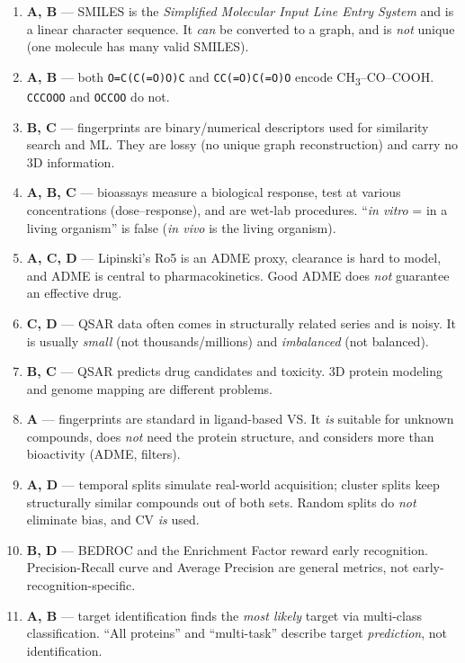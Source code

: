 \documentclass[11pt,oneside]{article}
\begin{document}
\begin{enumerate}[label=\textbf{Q\arabic*.}, leftmargin=3em, itemsep=4pt]
  \item \textbf{A, B} --- SMILES is the \emph{Simplified Molecular Input Line Entry System} and is a linear character sequence. It \emph{can} be converted to a graph, and is \emph{not} unique (one molecule has many valid SMILES).
  \item \textbf{A, B} --- both \texttt{O=C(C(=O)O)C} and \texttt{CC(=O)C(=O)O} encode CH\textsubscript{3}--CO--COOH. \texttt{CCCOOO} and \texttt{OCCOO} do not.
  \item \textbf{B, C} --- fingerprints are binary/numerical descriptors used for similarity search and ML. They are lossy (no unique graph reconstruction) and carry no 3D information.
  \item \textbf{A, B, C} --- bioassays measure a biological response, test at various concentrations (dose--response), and are wet-lab procedures. ``\emph{in vitro} = in a living organism'' is false (\emph{in vivo} is the living organism).
  \item \textbf{A, C, D} --- Lipinski's Ro5 is an ADME proxy, clearance is hard to model, and ADME is central to pharmacokinetics. Good ADME does \emph{not} guarantee an effective drug.
  \item \textbf{C, D} --- QSAR data often comes in structurally related series and is noisy. It is usually \emph{small} (not thousands/millions) and \emph{imbalanced} (not balanced).
  \item \textbf{B, C} --- QSAR predicts drug candidates and toxicity. 3D protein modeling and genome mapping are different problems.
  \item \textbf{A} --- fingerprints are standard in ligand-based VS. It \emph{is} suitable for unknown compounds, does \emph{not} need the protein structure, and considers more than bioactivity (ADME, filters).
  \item \textbf{A, D} --- temporal splits simulate real-world acquisition; cluster splits keep structurally similar compounds out of both sets. Random splits do \emph{not} eliminate bias, and CV \emph{is} used.
  \item \textbf{B, D} --- BEDROC and the Enrichment Factor reward early recognition. Precision-Recall curve and Average Precision are general metrics, not early-recognition-specific.
  \item \textbf{A, B} --- target identification finds the \emph{most likely} target via multi-class classification. ``All proteins'' and ``multi-task'' describe target \emph{prediction}, not identification.

\end{enumerate}
\end{document}
